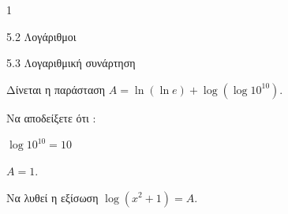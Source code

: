 \begin{ylh}{1}
\item 5.2 Λογάριθμοι
\item 5.3 Λογαριθμική συνάρτηση
\end{ylh}
Δίνεται η παράσταση $A = \ln(\ln e) + \log(\log 10^{10})$.
\begin{alist}
\item Να αποδείξετε ότι :
\begin{rlist}
\item $\log 10^{10} = 10$
\item $A = 1$.
\end{rlist}
\item Να λυθεί η εξίσωση $\log(x^2 + 1) = A$.
\end{alist}

